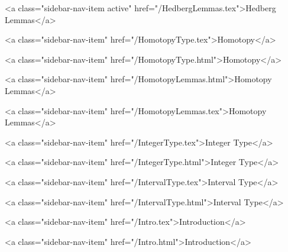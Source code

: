       
        
          <a class="sidebar-nav-item active" href="/HedbergLemmas.tex">Hedberg Lemmas</a>
        
      
    
      
        
          <a class="sidebar-nav-item" href="/HomotopyType.tex">Homotopy</a>
        
      
    
      
        
          <a class="sidebar-nav-item" href="/HomotopyType.html">Homotopy</a>
        
      
    
      
        
          <a class="sidebar-nav-item" href="/HomotopyLemmas.html">Homotopy Lemmas</a>
        
      
    
      
        
          <a class="sidebar-nav-item" href="/HomotopyLemmas.tex">Homotopy Lemmas</a>
        
      
    
      
        
          <a class="sidebar-nav-item" href="/IntegerType.tex">Integer Type</a>
        
      
    
      
        
          <a class="sidebar-nav-item" href="/IntegerType.html">Integer Type</a>
        
      
    
      
        
          <a class="sidebar-nav-item" href="/IntervalType.tex">Interval Type</a>
        
      
    
      
        
          <a class="sidebar-nav-item" href="/IntervalType.html">Interval Type</a>
        
      
    
      
        
          <a class="sidebar-nav-item" href="/Intro.tex">Introduction</a>
        
      
    
      
        
          <a class="sidebar-nav-item" href="/Intro.html">Introduction</a>
        
      
    
